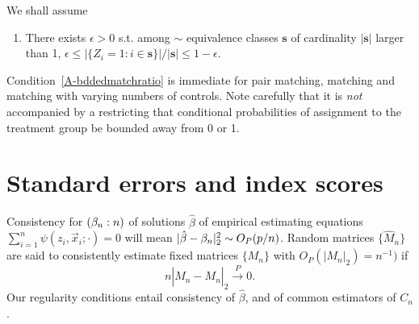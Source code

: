 \documentclass{article}
\newcounter{saveenumi}
\newcommand{\conti}{\setcounter{enumi}{\value{saveenumi}}}
\theoremstyle{remark}
\begin{document}
We shall assume
\begin{enumerate} \conti
\item \label{A-bddedmatchratio} There exists $\epsilon>0$ s.t. among $\sim$ equivalence classes $\mathbf{s}$ of cardinality $|\mathbf{s}|$ larger than 1, $\epsilon \leq | \{Z_i=1: i\in \mathbf{s} \}|/|\mathbf{s}| \leq 1-\epsilon$. 
\end{enumerate}

Condition~\ref{A-bddedmatchratio} is immediate for pair matching,  matching and matching with varying numbers of controls.  Note carefully that it is \textit{not} accompanied by a restricting that conditional probabilities of assignment to the treatment group be bounded away from 0 or 1. 

\section{Standard errors and index scores}

Consistency for $(\beta_{n }: n)$ of solutions $\hat{\beta}$ of empirical estimating equations $\sum_{i=1}^{n}\psi(z_{i}, \vec{x}_{i}; \cdot) = 0 $ will mean  $|\hat\beta - \beta_{n }|_{2}^{2} \sim O_{P}(p/n)$.
Random matrices $\{ \hat{M}_{n} \}$ are said to consistently estimate fixed matrices $\{M_{n}\}$ with $O_{P}(|M_{n}|_{2}) = n^{-1})$ if
$$n|\hat{M}_{n} - {M}_{n}|_{2} \stackrel{P}{\rightarrow} 0.$$
Our regularity conditions entail consistency of $\hat\beta$, and of common estimators of $C_{n}$.  
\end{document}
